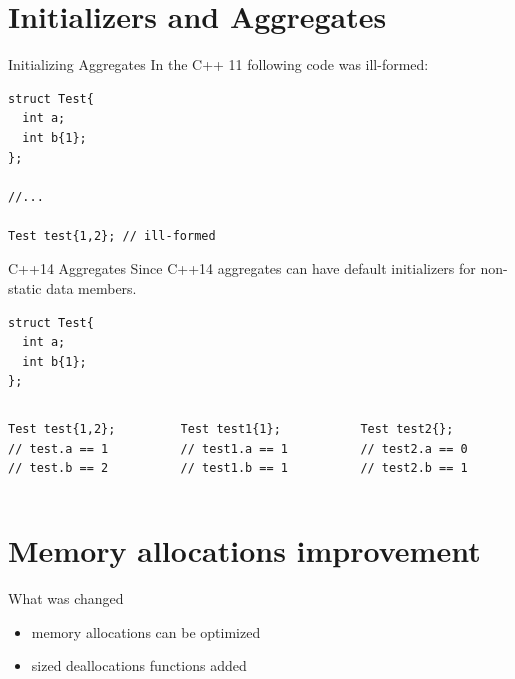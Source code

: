 \documentclass[10pt]{beamer}
\begin{document}
\section{Initializers and Aggregates}
\begin{frame}[fragile]{Initializing Aggregates}
	In the C++ 11 following code was ill-formed:
	\begin{verbatim}
struct Test{
  int a;
  int b{1};
};

//...

Test test{1,2}; // ill-formed
	\end{verbatim}
\end{frame}

\begin{frame}[fragile]{C++14 Aggregates}
	Since C++14 aggregates can have default initializers for non-static data members.

\begin{verbatim}
struct Test{
  int a;
  int b{1};
};
\end{verbatim}
\vfill

	\begin{columns}
	\begin{column}{0.3\linewidth}
\begin{verbatim}
Test test{1,2};
// test.a == 1
// test.b == 2
	\end{verbatim}
	\end{column} \pause
	\begin{column}{0.3\linewidth}
\begin{verbatim}
Test test1{1};
// test1.a == 1
// test1.b == 1	
	\end{verbatim}
	\end{column} \pause
	\begin{column}{0.3\linewidth}
\begin{verbatim}
Test test2{};
// test2.a == 0
// test2.b == 1
	\end{verbatim}
	\end{column}	
	\end{columns}
\end{frame}

\section{Memory allocations improvement}
\begin{frame}[fragile]{What was changed}
	\begin{itemize}[<+- |alert@+>]
		\item memory allocations can be optimized
		\item sized deallocations functions added
	\end{itemize}
\end{frame}
\end{document}
